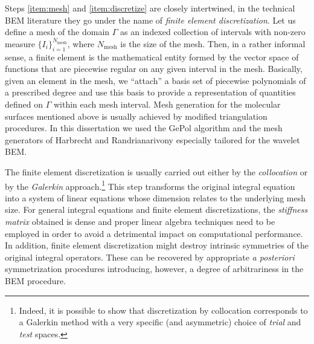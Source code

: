 Steps \ref{item:mesh} and \ref{item:discretize} are closely intertwined,
in the technical \acrshort{BEM} literature they go under the name of
\emph{finite element discretization}.
Let us define a mesh of the domain $\Gamma$ as an indexed collection of
intervals with non-zero measure $\lbrace I_i\rbrace_{i=1}^{N_\mathrm{mesh}}$, where
$N_\mathrm{mesh}$ is the size of the mesh.
Then, in a rather informal sense, a finite element is the
mathematical entity formed by the vector space of functions that are
piecewise regular on any given interval in the mesh.\autocite{Ern2004-oo}
Basically, given an element in the mesh, we \enquote{attach} a basis set of
piecewise polynomials of a prescribed degree and use this basis to
provide a representation of quantities defined on $\Gamma$ within each
mesh interval.
Mesh generation for the molecular surfaces mentioned above is usually
achieved by modified triangulation procedures. In this dissertation we used
the GePol algorithm\autocite{Pascual-Ahuir1987-uo, Pascual-Ahuir1990-lp,
Pomelli1998-qp, Pomelli2001-sj, Frediani2004-ua, Pomelli2007-wq}
and the mesh generators of Harbrecht and Randrianarivony especially
tailored for the wavelet \acrshort{BEM}.\autocite{Harbrecht2009-no,
Harbrecht2011-dk}

The finite element discretization is usually carried out either by the
\emph{collocation} or by the \emph{Galerkin}
approach.\autocite{Hackbusch1995-uq, Ern2004-oo}\footnote{ Indeed, it is
possible to show that discretization by collocation corresponds to a
Galerkin method with a very specific (and asymmetric) choice of
\emph{trial} and \emph{test} spaces.}
This step transforms the original integral equation into a system of
linear equations whose dimension relates to the underlying mesh size.
For general integral equations and finite element discretizations,
the \emph{stiffness matrix} obtained is dense and proper linear algebra
techniques need to be employed in order to avoid a detrimental impact on
computational performance.
In addition, finite element discretization might destroy intrinsic
symmetries of the original integral
operators. These can be recovered by appropriate \emph{a posteriori}
symmetrization procedures introducing, however, a degree of
arbitrariness in the \acrshort{BEM} procedure.\autocite{Lange2011-eu}

